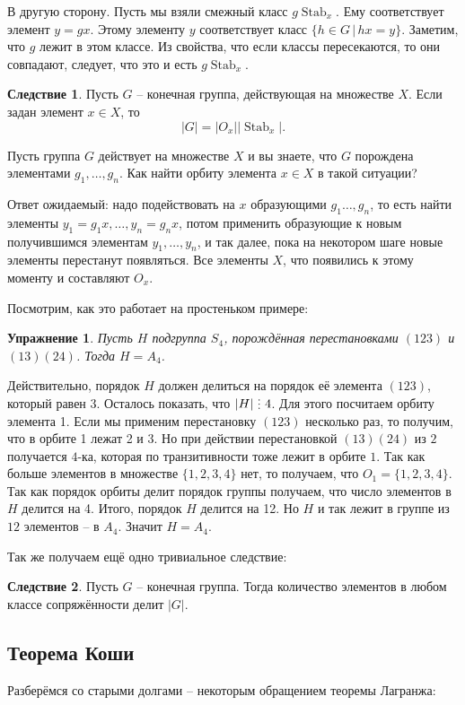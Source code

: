 \documentclass[10pt,a4paper,oneside]{book}
\newtheorem{uprz}{\color{violet!100!black} Упражнение}
\theoremstyle{definition}
\newtheorem{cor}{\color{green!45!black}Следствие}
\newcommand{\Stab}{\operatorname{Stab}}
\newcommand{\di}{\mathop{\,\scalebox{0.85}{\raisebox{-1.2pt}[0.5\height]{\vdots}}\,}}
\def\crl{\begin{cor}}
\def\ecrl{\end{cor}}
\def\upr{\begin{uprz}}
\def\eupr{\end{uprz}}
\begin{document}
В другую сторону. Пусть мы взяли смежный класс $g\Stab_x$. Ему соответствует элемент $y=gx$. Этому элементу $y$ соответствует класс $\{h\in G\,|\, hx=y\}$. Заметим, что $g$ лежит в этом классе. Из свойства, что если классы пересекаются, то они совпадают, следует, что это и есть $g\Stab_x$.
\endproof

\crl
Пусть $G$ -- конечная группа, действующая на множестве $X$. Если задан элемент $x\in X$, то $$|G|=|O_x||\Stab_x|.$$
\ecrl


Пусть группа $G$ действует на множестве $X$ и вы знаете, что $G$ порождена элементами $g_1,\dots,g_n$. Как найти орбиту элемента $x \in X$ в такой ситуации?

Ответ ожидаемый: надо подействовать на $x$ образующими $g_1\dots,g_n$, то есть найти элементы $y_1=g_1x,\dots, y_n=g_n x$, потом применить образующие к новым получившимся элементам $y_1,\dots, y_n$, и так далее, пока на некотором шаге  новые элементы перестанут появляться. Все элементы $X$, что появились к этому моменту и составляют  $O_x$.

Посмотрим, как это работает на простеньком примере:

\upr Пусть $H$ подгруппа $S_4$, порождённая перестановками $(123)$ и $(13)(24)$. Тогда $H=A_4$.
\eupr
\proof[Решение]
Действительно, порядок $H$ должен делиться на порядок её элемента $(123)$, который равен 3. Осталось показать, что $|H|\di 4$. Для этого посчитаем орбиту элемента 1. Если мы применим перестановку $(123)$ несколько раз, то получим, что в орбите 1 лежат 2 и 3. Но при действии перестановкой $(13)(24)$ из $2$ получается $4$-ка, которая по транзитивности тоже лежит в орбите $1$. Так как больше элементов в множестве $\{1,2,3,4\}$ нет, то получаем, что $O_1=\{1,2,3,4\}$. Так как порядок орбиты делит порядок группы получаем, что число элементов в $H$ делится на 4. Итого, порядок $H$ делится на 12. Но $H$ и так лежит в группе из $12$ элементов -- в $A_4$. Значит $H=A_4$.
\endproof

Так же получаем ещё одно тривиальное следствие:

\crl Пусть $G$ -- конечная группа. Тогда количество элементов в любом классе сопряжённости делит $|G|$. 
\ecrl



\subsection{Теорема Коши}

Разберёмся со старыми долгами -- некоторым обращением теоремы Лагранжа:
\end{document}
